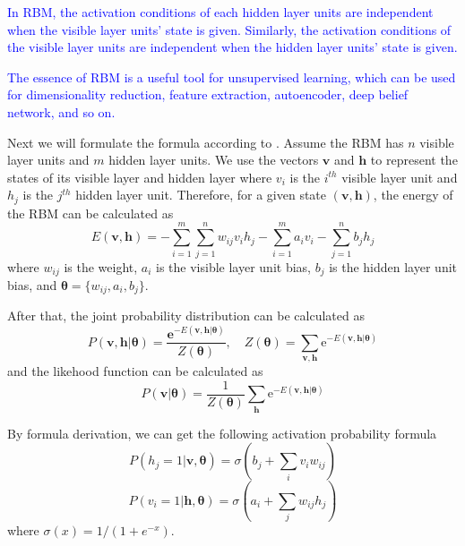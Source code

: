 \documentclass{modified}
\begin{document}
\textcolor{blue}{In RBM, the activation conditions of each hidden layer units are independent when the visible layer units' state is given. Similarly, the activation conditions of the visible layer units are independent when the hidden layer units' state is given.}

\textcolor{blue}{The essence of RBM is a useful tool for unsupervised learning, which can be used for dimensionality reduction, feature extraction, autoencoder, deep belief network, and so on.}

Next we will formulate the formula according to \cite{zhangchunxia}. Assume the RBM has $n$ visible layer units and $m$ hidden layer units. We use the vectors $\mathbf{v}$ and $\mathbf{h}$ to represent the states of its visible layer and hidden layer where $v_i$ is the $i^{th}$ visible layer unit and $h_j$ is the $j^{th}$ hidden layer unit. Therefore, for a given state $(\mathbf{v}, \mathbf{h})$, the energy of the RBM can be calculated as
\begin{equation}
E(\mathbf{v}, \mathbf{h})=-\sum_{i=1}^{m} \sum_{j=1}^{n} w_{i j} v_{i} h_{j}-\sum_{i=1}^{m} a_{i} v_{i}-\sum_{j=1}^{n} b_{j} h_{j}
\end{equation}
where $w_{ij}$ is the weight, $a_{i}$ is the visible layer unit bias, $b_{j}$ is the hidden layer unit bias, and $\boldsymbol{\theta}=\{w_{ij}, a_i, b_j\}$.

After that, the joint probability distribution can be calculated as 
\begin{equation}
P(\mathbf{v}, \mathbf{h} | \boldsymbol{\theta})=\frac{\mathbf{e}^{-E(\mathbf{v}, \mathbf{h} | \boldsymbol{\theta})}}{Z(\boldsymbol{\theta})}, \quad Z(\boldsymbol{\theta})=\sum_{\mathbf{v}, \mathbf{h}} \mathrm{e}^{-E(\mathbf{v}, \mathbf{h} | \boldsymbol{\theta})}
\end{equation}
and the likehood function can be calculated as
\begin{equation}
P(\mathbf{v} | \boldsymbol{\theta})=\frac{1}{Z(\boldsymbol{\theta})} \sum_{\mathbf{h}} \mathrm{e}^{-E(\mathbf{v}, \mathbf{h} | \boldsymbol{\theta})}
\end{equation}

By formula derivation, we can get the following activation probability formula
\begin{equation}
P\left(h_{j}=1 | \mathbf{v}, \boldsymbol{\theta}\right)=\sigma\left(b_{j}+\sum_{i} v_{i} w_{i j}\right)
\end{equation}
\begin{equation}
P\left(v_{i}=1 | \mathbf{h}, \boldsymbol{\theta}\right)=\sigma\left(a_{i}+\sum_{j} w_{i j} h_{j}\right)
\end{equation}
where $\sigma(x)=1/(1+e^{-x})$.
\end{document}
